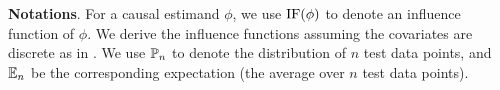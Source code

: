 

%
%



%

% 

%

%

\onecolumn
{}

\noindent \textbf{Notations}.
For a causal estimand $\phi$, we use $\text{IF}(\phi)$ to denote an influence function of $\phi$.
We derive the influence functions assuming the covariates are discrete as in \cite{kennedy2022semiparametric}.
We use $\mathbb{P}_n$ to denote the distribution of $n$ test data points, and $\mathbb{E}_n$ be the corresponding expectation (the average over $n$ test data points).

